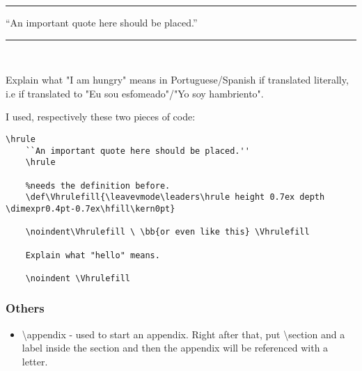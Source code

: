 \hrule
``An important quote here should be placed.''
\hrule
\vspace{1cm}
\noindent\Vhrulefill \  \Vhrulefill

Explain what "I am hungry" means in Portuguese/Spanish if translated literally, i.e if translated to "Eu sou esfomeado"/"Yo soy hambriento".

\noindent \Vhrulefill
\vspace{.5cm}

I used, respectively these two pieces of code:
\begin{lstlisting}[language = Tex]
    \hrule
    ``An important quote here should be placed.''
    \hrule

    %needs the definition before.
    \def\Vhrulefill{\leavevmode\leaders\hrule height 0.7ex depth \dimexpr0.4pt-0.7ex\hfill\kern0pt}

    \noindent\Vhrulefill \ \bb{or even like this} \Vhrulefill

    Explain what "hello" means.

    \noindent \Vhrulefill

\end{lstlisting}



\subsubsection{Others}
\begin{itemize}
    \item \textbackslash appendix - used to start an appendix. Right after that, put \textbackslash section and a label inside the section and then the appendix will be referenced with a letter.
\end{itemize}

